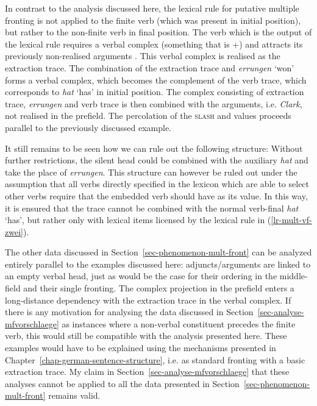 In contrast to the analysis discussed here, the lexical rule for putative multiple fronting is not applied
to the finite verb (which was present in initial position), but rather to the non-finite verb in final position.
The verb which is the output of the lexical rule requires a verbal complex (something that is \lex +) and attracts its previously non-realised
arguments . This verbal complex is realised as the extraction trace. The combination of the extraction trace
and \emph{errungen} `won' forms a verbal complex, which becomes the complement of the verb trace,
which corresponds to \emph{hat} `has' in initial position. The complex consisting of extraction trace, \emph{errungen} and verb trace is then combined with the
arguments, i.e. \emph{Clark}, not realised in the prefield. The percolation of the \textsc{slash} and \dsl values
proceeds parallel to the previously discussed example.


It still remains to be seen how we can rule out the following structure:
\z
Without further restrictions, the silent head could be combined with the auxiliary \emph{hat} and take the
place of \emph{errungen}. This structure can however be ruled out under the assumption that all verbs directly specified
in the lexicon which are able to select other verbs require that the embedded verb should have  as its \dsl value.
In this way, it is ensured that the trace cannot be combined with the normal verb-final \emph{hat} `has', but rather only
with lexical items licensed by the lexical rule in (\ref{lr-mult-vf-zwei}).

The other data discussed in Section~\ref{sec-phenomenon-mult-front} can be analyzed entirely parallel to the examples discussed here:
adjuncts/arguments are linked to an empty verbal head, just as would be the case for their ordering in the middle-field and
their single fronting. The complex projection in the prefield enters a long-distance dependency with the extraction trace in the
verbal complex. If there is any motivation for analysing the data discussed in Section~\ref{sec-analyse-mfvorschlaege} as instances where
a non-verbal constituent precedes the finite verb, this would still be compatible with the analysis presented here. These examples would
have to be explained using the mechanisms presented in Chapter~\ref{chap-german-sentence-structure}, i.e. as standard fronting with a basic extraction trace.
My claim in Section~\ref{sec-analyse-mfvorschlaege} that these analyses cannot be applied to all the data presented in Section~\ref{sec-phenomenon-mult-front}
remains valid.

